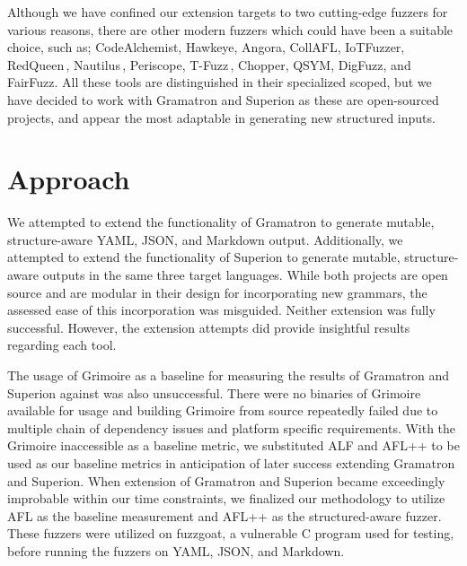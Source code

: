 \documentclass[12pt]{diazessay}
\begin{document}
Although we have confined our extension targets to two cutting-edge fuzzers for various reasons, there are other modern fuzzers which could have been a suitable choice, such as; CodeAlchemist\cite{CodeAlchemist1}\cite{CodeAlchemist2}, Hawkeye\cite{Hawkeye}, Angora\cite{Angora1}\cite{Angora2}, CollAFL\cite{CollAFL}, IoTFuzzer\cite{IoTFuzzer}, RedQueen\,\cite{redqueen}, Nautilus\,\cite{Nautilus1}\cite{Nautilus2}, Periscope\cite{PeriScope1}\cite{PeriScope2}, T-Fuzz\,\cite{TFuzz1}\cite{TFuzz2}, Chopper\cite{Chopper}, QSYM\cite{QSYM1}\cite{QSYM2}, DigFuzz\cite{DigFuzz}, and FairFuzz\cite{FairFuzz1}\cite{FairFuzz2}.
All these tools are distinguished in their specialized scoped, but we have decided to work with Gramatron and Superion as these are open-sourced projects, and appear the most adaptable in generating new structured inputs.


\vspace{3mm}
\section*{Approach}

We attempted to extend the functionality of Gramatron to generate mutable, structure-aware YAML, JSON, and Markdown output.
Additionally, we attempted to extend the functionality of Superion to generate mutable, structure-aware outputs in the same three target languages.
While both projects are open source and are modular in their design for incorporating new grammars, the assessed ease of this incorporation was misguided.
Neither extension was fully successful.
However, the extension attempts did provide insightful results regarding each tool.

The usage of Grimoire as a baseline for measuring the results of Gramatron and Superion against was also unsuccessful.
There were no binaries of Grimoire available for usage and building Grimoire from source repeatedly failed due to multiple chain of dependency issues and platform specific requirements.
With the Grimoire inaccessible as a baseline metric, we substituted ALF and AFL++ to be used as our baseline metrics in anticipation of later success extending Gramatron and Superion.
When extension of Gramatron and Superion became exceedingly improbable within our time constraints, we finalized our methodology to utilize AFL as the baseline measurement and AFL++ as the structured-aware fuzzer. These fuzzers were utilized on fuzzgoat, a vulnerable C program used for testing, before running the fuzzers on YAML, JSON, and Markdown.
\end{document}
